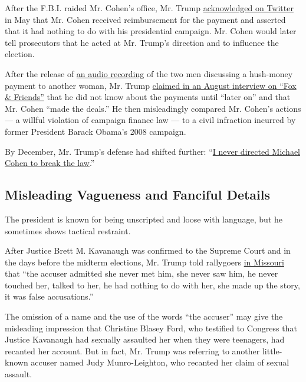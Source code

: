 After the F.B.I. raided Mr. Cohen's office, Mr. Trump
\href{https://twitter.com/realDonaldTrump/status/991992302267785216}{acknowledged
on Twitter} in May that Mr. Cohen received reimbursement for the payment
and asserted that it had nothing to do with his presidential campaign.
Mr. Cohen would later tell prosecutors that he acted at Mr. Trump's
direction and to influence the election.

After the release of
\href{https://www.nytimes.com/2018/07/25/us/politics/trump-michael-cohen-recording.html?module=inline}{an
audio recording} of the two men discussing a hush-money payment to
another woman, Mr. Trump
\href{https://www.nytimes.com/2018/08/23/us/politics/fact-check-trump-fox-interview.html}{claimed
in an August interview on ``Fox \& Friends''} that he did not know about
the payments until ``later on'' and that Mr. Cohen ``made the deals.''
He then misleadingly compared Mr. Cohen's actions --- a willful
violation of campaign finance law --- to a civil infraction incurred by
former President Barack Obama's 2008 campaign.

By December, Mr. Trump's defense had shifted further:
``\href{https://twitter.com/realDonaldTrump/status/1073205176872435713}{I
never directed Michael Cohen to break the law}.''

\hypertarget{misleading-vagueness-and-fanciful-details}{%
\subsection{Misleading Vagueness and Fanciful
Details}\label{misleading-vagueness-and-fanciful-details}}

The president is known for being unscripted and loose with language, but
he sometimes shows tactical restraint.

After Justice Brett M. Kavanaugh was confirmed to the Supreme Court and
in the days before the midterm elections, Mr. Trump told rallygoers
\href{https://www.c-span.org/video/?453853-1/president-trump-holds-missouri-rally-rush-limbaugh-sean-hannity\&start=3234}{in
Missouri} that ``the accuser admitted she never met him, she never saw
him, he never touched her, talked to her, he had nothing to do with her,
she made up the story, it was false accusations.''

The omission of a name and the use of the words ``the accuser'' may give
the misleading impression that Christine Blasey Ford, who testified to
Congress that Justice Kavanaugh had sexually assaulted her when they
were teenagers, had recanted her account. But in fact, Mr. Trump was
referring to another little-known accuser named Judy Munro-Leighton, who
recanted her claim of sexual assault.

